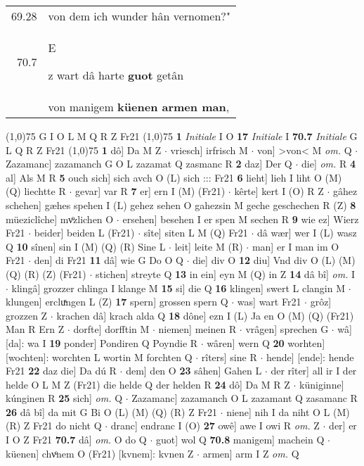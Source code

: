 \documentclass[8pt,a4paper,notitlepage]{article}
\begin{document}
\begin{table}[ht]
\begin{minipage}[t]{0.5\linewidth}
\begin{tabular}{rl}
69.28 & von dem ich wunder hân vernomen?"\\ 
70.7 & \begin{large}E\end{large}z wart dâ harte \textbf{guot} getân\\ 
 & von manigem \textbf{küenen armen man},\\ 
\end{tabular}
\scriptsize
\line(1,0){75} \newline
G I O L M Q R Z Fr21 \newline
\line(1,0){75} \newline
\textbf{1} \textit{Initiale} I O  \textbf{17} \textit{Initiale} I  \textbf{70.7} \textit{Initiale} G L Q R Z Fr21  \newline
\line(1,0){75} \newline
\textbf{1} dô] Da M Z  $\cdot$ vriesch] irfrisch M  $\cdot$ von] >von< M \textit{om.} Q  $\cdot$ Zazamanc] zazamanch G O L zazamat Q zasmanc R \textbf{2} daz] Der Q  $\cdot$ die] \textit{om.} R \textbf{4} al] Als M R \textbf{5} ouch sich] sich avch O (L) sich ::: Fr21 \textbf{6} lieht] lieh I liht O (M) (Q) liechtte R  $\cdot$ gevar] var R \textbf{7} er] ern I (M) (Fr21)  $\cdot$ kêrte] kert I (O) R Z  $\cdot$ gâhez schehen] gæhes spehen I (L) gehez sehen O gahezsin M geche geschechen R (Z) \textbf{8} müeziclîche] mvͦzlichen O  $\cdot$ ersehen] besehen I er spen M sechen R \textbf{9} wie ez] Wierz Fr21  $\cdot$ beider] beiden L (Fr21)  $\cdot$ sîte] siten L M (Q) Fr21  $\cdot$ dâ wær] wer I (L) wasz Q \textbf{10} sînen] sin I (M) (Q) (R) Sine L  $\cdot$ leit] leite M (R)  $\cdot$ man] er I man im O Fr21  $\cdot$ den] di Fr21 \textbf{11} dâ] wie G Do O Q  $\cdot$ die] div O \textbf{12} diu] Vnd div O (L) (M) (Q) (R) (Z) (Fr21)  $\cdot$ stichen] streyte Q \textbf{13} in ein] eyn M (Q) in Z \textbf{14} dâ bî] \textit{om.} I  $\cdot$ klingâ] grozzer chlinga I klange M \textbf{15} si] die Q \textbf{16} klingen] swert L clangin M  $\cdot$ klungen] ercluͯngen L (Z) \textbf{17} spern] grossen spern Q  $\cdot$ was] wart Fr21  $\cdot$ grôz] grozzen Z  $\cdot$ krachen dâ] krach alda Q \textbf{18} dône] ezn I (L) Ja en O (M) (Q) (Fr21) Man R Ern Z  $\cdot$ dorfte] dorfftin M  $\cdot$ niemen] meinen R  $\cdot$ vrâgen] sprechen G  $\cdot$ wâ] [da]: wa I \textbf{19} ponder] Pondiren Q Poyndie R  $\cdot$ wâren] wern Q \textbf{20} worhten] [wochten]: worchten L wortin M forchten Q  $\cdot$ rîters] sine R  $\cdot$ hende] [ende]: hende Fr21 \textbf{22} daz die] Da dú R  $\cdot$ dem] den O \textbf{23} sâhen] Gahen L  $\cdot$ der rîter] all ir I der helde O L M Z (Fr21) die helde Q der helden R \textbf{24} dô] Da M R Z  $\cdot$ küniginne] kúnginen R \textbf{25} sich] \textit{om.} Q  $\cdot$ Zazamanc] zazamanch O L zazamant Q zasamanc R \textbf{26} dâ bî] da mit G Bi O (L) (M) (Q) (R) Z Fr21  $\cdot$ niene] nih I da niht O L (M) (R) Z Fr21 do nicht Q  $\cdot$ dranc] endranc I (O) \textbf{27} owê] awe I owi R \textit{om.} Z  $\cdot$ der] er I O Z Fr21 \textbf{70.7} dâ] \textit{om.} O do Q  $\cdot$ guot] wol Q \textbf{70.8} manigem] machein Q  $\cdot$ küenen] chvͦnem O (Fr21) [kvnem]: kvnen  Z  $\cdot$ armen] arm I Z \textit{om.} Q \newline

\end{minipage}
\end{table}
\end{document}

